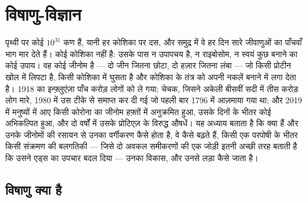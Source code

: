 \chapter{विषाणु-विज्ञान}\label{ch:b3:virology}

पृथ्वी पर कोई $10^{31}$  कण हैं, यानी हर कोशिका पर दस, और समुद्र
में वे हर दिन सारे जीवाणुओं का पाँचवाँ भाग मार देते हैं। कोई 
कोशिका नहीं है: उसके पास न उपापचय है, न राइबोसोम, न स्वयं कुछ बनाने का
कोई उपाय। वह कोई जीनोम है --- दो जीन जितना छोटा, दो हज़ार जितना लंबा ---
जो किसी प्रोटीन खोल में लिपटा है, किसी कोशिका में घुसता है और कोशिका के
तंत्र को अपनी नकलें बनाने में लगा देता है। 1918 का इन्फ़्लुएंज़ा पाँच
करोड़ लोगों को ले गया; चेचक, जिसने अकेली बीसवीं सदी में तीस करोड़ लोग
मारे, 1980 में उस टीके से समाप्त कर दी गई जो पहली बार 1796 में आज़माया
गया था; और 2019 में मनुष्यों में आए किसी कोरोना  का जीनोम हफ़्तों
में अनुक्रमित हुआ, उसके दिनों के भीतर कोई  अभिकल्पित हुआ, और दो
वर्षों में उसके प्रोटिएज़ के विरुद्ध औषधें। यह अध्याय बताता है कि
 क्या हैं और उनके जीनोमों की रसायन से उनका वर्गीकरण कैसे होता है,
वे कैसे बढ़ते हैं, किसी एक परपोषी के भीतर किसी संक्रमण की बलगतिकी ---
जिसे दो अवकल समीकरणों की एक जोड़ी इतनी अच्छी तरह बताती है कि उसने एड्स
का उपचार बदल दिया --- उनका विकास, और उनसे लड़ा कैसे जाता है।

\section{विषाणु क्या है}

